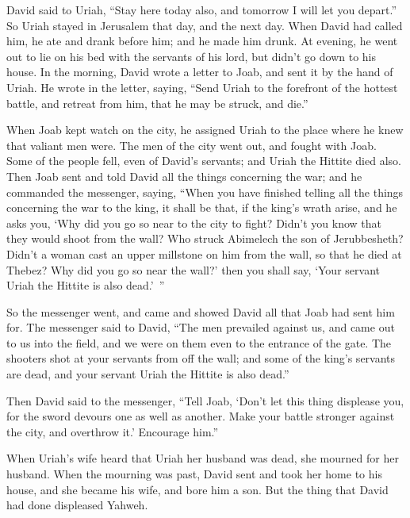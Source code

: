 {\par }{\PP {}David said to Uriah, “Stay here today also, and tomorrow I will let you depart.” So Uriah stayed in Jerusalem that day, and the next day.
When David had called him, he ate and drank before him; and he made him drunk. At evening, he went out to lie on his bed with the servants of his lord, but didn’t go down to his house.
In the morning, David wrote a letter to Joab, and sent it by the hand of Uriah.
He wrote in the letter, saying, “Send Uriah to the forefront of the hottest battle, and retreat from him, that he may be struck, and die.”
\par }{\PP {}When Joab kept watch on the city, he assigned Uriah to the place where he knew that valiant men were.
The men of the city went out, and fought with Joab. Some of the people fell, even of David’s servants; and Uriah the Hittite died also.
Then Joab sent and told David all the things concerning the war;
and he commanded the messenger, saying, “When you have finished telling all the things concerning the war to the king,
it shall be that, if the king’s wrath arise, and he asks you, ‘Why did you go so near to the city to fight? Didn’t you know that they would shoot from the wall?
Who struck Abimelech the son of Jerubbesheth? Didn’t a woman cast an upper millstone on him from the wall, so that he died at Thebez? Why did you go so near the wall?’ then you shall say, ‘Your servant Uriah the Hittite is also dead.’ ”
\par }{\PP {}So the messenger went, and came and showed David all that Joab had sent him for.
The messenger said to David, “The men prevailed against us, and came out to us into the field, and we were on them even to the entrance of the gate.
The shooters shot at your servants from off the wall; and some of the king’s servants are dead, and your servant Uriah the Hittite is also dead.”
\par }{\PP {}Then David said to the messenger, “Tell Joab, ‘Don’t let this thing displease you, for the sword devours one as well as another. Make your battle stronger against the city, and overthrow it.’ Encourage him.”
\par }{\PP {}When Uriah’s wife heard that Uriah her husband was dead, she mourned for her husband.
When the mourning was past, David sent and took her home to his house, and she became his wife, and bore him a son. But the thing that David had done displeased Yahweh.

}
